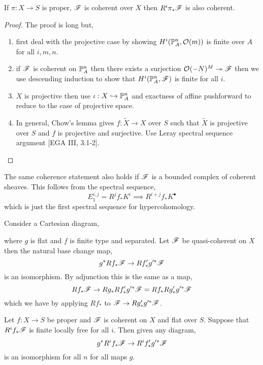 \documentclass[12pt]{article}
\begin{document}
\begin{thm}
If $\pi : X \to S$ is proper, $\F$ is coherent over $X$ then $R^i \pi_* \F$ is also coherent.
\end{thm}

\begin{proof}
The proof is long but,
\begin{enumerate}
\item first deal with the projective case by showing $H^i(\P^n_A, \struct{}(m))$ is finite over $A$ for all $i, m, n$.
\item if $\F$ is coherent on $\P^n_A$ then there exists a surjection $\struct{}(-N)^M \onto \F$ then we use descending induction to show that $H^i(\P^n_A, \F)$ is finite for all $i$.
\item $X$ is projective then use $\iota : X \embed \P^n_A$ and exactness of affine pushforward to reduce to the case of projective space.
\item In general, Chow's lemma gives $f : \tilde{X} \to X$ over $S$ such that $\tilde{X}$ is projective over $S$ and $f$ is projective and surjective. Use Leray spectral sequence argument [EGA III, 3.1-2].
\end{enumerate}
\end{proof}

\begin{rmk}
The same coherence statement also holds if $\F$ is a bounded complex of coherent sheaves. This follows from the spectral sequence,
\[ E_1^{i,j} = R^j f_* K^i \implies R^{i+j} f_* K^\bullet \]
which is just the first spectral sequence for hypercohomology.
\end{rmk}

\begin{thm}
Consider a Cartesian diagram,
\begin{center}
\end{center}
where $g$ is flat and $f$ is finite type and separated.
Let $\F$ be quasi-coherent on $X$ then the natural base change map,
\[ g^* R f_* \F \to R f'_* g'^* \F \]
is an isomorphism. By adjunction this is the same as a map,
\[ R f_* \F \to R g_* Rf'_* g'^* \F = R f_* R g'_* g'^* \F \]
which we have by applying $R f_*$ to $\F \to R g'_* g'^* \F$.
\end{thm}

\begin{theorem}
Let $f : X \to S$ be proper and $\F$ is coherent on $X$ and flat over $S$. Suppose that $R^i f_* \F$ is finite locally free for all $i$. Then given any diagram,
\[ g^* R^i f_* \F \to R^i f'_* g'^* \F \]
is an isomorphism for all $n$ for all maps $g$.
\end{theorem}
\end{document}
